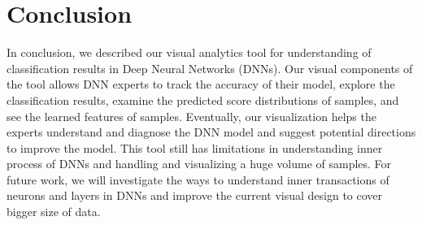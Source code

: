 \section{Conclusion}

In conclusion, we described our visual analytics tool for understanding of classification results in Deep Neural Networks (DNNs).
Our visual components of the tool allows DNN experts to track the accuracy of their model, explore the classification results, examine the predicted score distributions of samples, and see the learned features of samples.
Eventually, our visualization helps the experts understand and diagnose the DNN model and suggest potential directions to improve the model.
This tool still has limitations in understanding inner process of DNNs and handling and visualizing a huge volume of samples.
For future work, we will investigate the ways to understand inner transactions of neurons and layers in DNNs and improve the current visual design to cover bigger size of data.



